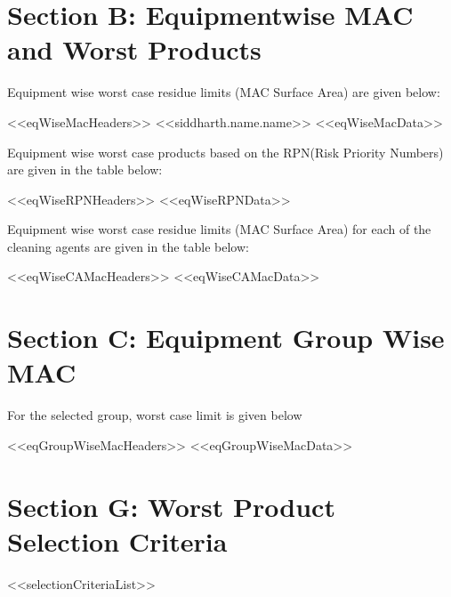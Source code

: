 \documentclass{article}
\begin{document}
        \newpage
        \section{Section B: Equipmentwise MAC and Worst Products}
        Equipment wise worst case residue limits (MAC Surface Area) are given below:
        \begin{longtable}[l]{<<eqWiseMacHeaders>>}
        <<siddharth.name.name>>
        <<eqWiseMacData>>
        \end{longtable}
        Equipment wise worst case products based on the RPN(Risk Priority Numbers) are given in the table below:
        \begin{longtable}[l]{<<eqWiseRPNHeaders>>}
        <<eqWiseRPNData>>
        \end{longtable}
        Equipment wise worst case residue limits (MAC Surface Area) for each of the cleaning agents are given in the table below:
        \begin{longtable}[l]{<<eqWiseCAMacHeaders>>}
        <<eqWiseCAMacData>>
        \end{longtable}
        \newpage
        \section{Section C: Equipment Group Wise MAC}
        For the selected group, worst case limit is given below
        \begin{longtable}[l]{<<eqGroupWiseMacHeaders>>}
        <<eqGroupWiseMacData>>
        \end{longtable}
        \newpage
        \section{Section G: Worst Product Selection Criteria}
        <<selectionCriteriaList>>
        \newpage
\end{document}
